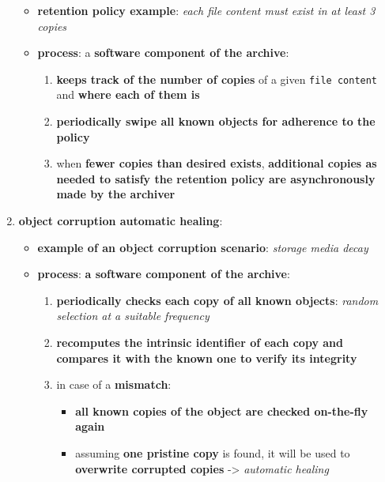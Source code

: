 \documentclass[11pt]{article}
\providecommand{\tightlist}{%
      \setlength{\itemsep}{0pt}\setlength{\parskip}{0pt}}
\begin{document}
\begin{enumerate}
  \begin{itemize}
  \tightlist
  \item
    \textbf{retention policy example}: \emph{each file content must
    exist in at least 3 copies}
  \item
    \textbf{process}: a \textbf{software component of the archive}:

    \begin{enumerate}
    \def\labelenumii{\arabic{enumii}.}
    \tightlist
    \item
      \textbf{keeps track of the number of copies} of a given
      \texttt{file\ content} and \textbf{where each of them is}
    \item
      \textbf{periodically swipe all known objects for adherence to the
      policy}
    \item
      when \textbf{fewer copies than desired exists}, \textbf{additional
      copies as needed to satisfy the retention policy are
      asynchronously made by the archiver}
    \end{enumerate}
  \end{itemize}
\item
  \textbf{object corruption automatic healing}:

  \begin{itemize}
  \tightlist
  \item
    \textbf{example of an object corruption scenario}: \emph{storage
    media decay}
  \item
    \textbf{process}: \textbf{a software component of the archive}:

    \begin{enumerate}
    \def\labelenumii{\arabic{enumii}.}
    \tightlist
    \item
      \textbf{periodically checks each copy of all known objects}:
      \emph{random selection at a suitable frequency}
    \item
      \textbf{recomputes the intrinsic identifier of each copy and
      compares it with the known one to verify its integrity}
    \item
      in case of a \textbf{mismatch}:

      \begin{itemize}
      \tightlist
      \item
        \textbf{all known copies of the object are checked on-the-fly
        again}
      \item
        assuming \textbf{one pristine copy} is found, it will be used to
        \textbf{overwrite corrupted copies} -\textgreater{}
        \emph{automatic healing}
      \end{itemize}
    \end{enumerate}
  \end{itemize}
\end{enumerate}
\end{document}
